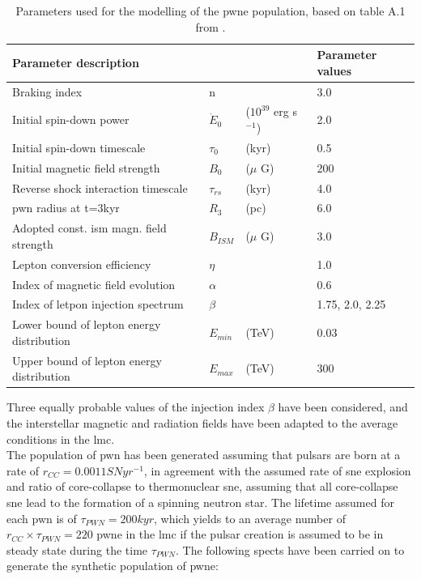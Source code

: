 \documentclass[main.tex]{subfiles}
\begin{document}
\begin{table}
  \centering
  \begin{tabular}{llll}
    \hline
    Parameter description & & & Parameter values \\
    \hline
    Braking index & n &  & 3.0 \\
    Initial spin-down power & $\dot E_{0}$ & ($10^{39}$ erg s$^{-1}$) & 2.0 \\
    Initial spin-down timescale &$\tau_{0}$ & (kyr) & 0.5 \\
    Initial magnetic field strength & $B_{0}$ & ($\mu$ G) & 200\\
    Reverse shock interaction timescale & $\tau_{rs}$ & (kyr) & 4.0 \\
    \gls{pwn} radius at t=3kyr & $R_{3}$ & (pc) & 6.0 \\
    Adopted const. \gls{ism} magn. field strength & $B_{ISM}$ &($\mu$ G) & 3.0 \\
    Lepton conversion efficiency & $\eta$ & & 1.0 \\
    Index of magnetic field evolution & $\alpha$ & & 0.6 \\
    Index of letpon injection spectrum & $\beta$ & & 1.75, 2.0, 2.25\\
    Lower bound of lepton energy distribution & $E_{min}$ & (TeV) & 0.03 \\
    Upper bound of lepton energy distribution & $E_{max}$ & (TeV) & 300\\
    \hline
  \end{tabular}
  \caption{Parameters used for the modelling of the \gls{pwne} population, based on table A.1 from \cite{2018hessPWNe}.}
  \label{tab:baselinemodelpwne}
\end{table}

Three equally probable values of the injection index $\beta$ have been considered, and the interstellar magnetic and radiation fields have been adapted to the average conditions in the \gls{lmc}.\\
The population of \gls{pwn} has been generated assuming that pulsars are born at a rate of $r_{CC} = 0.0011 SN yr^{-1}$, in agreement with the assumed rate of \gls{sne} explosion and ratio of core-collapse to thermonuclear \gls{sne}, assuming that all core-collapse \gls{sne} lead to the formation of a spinning neutron star. The lifetime assumed for each \gls{pwn} is of $\tau_{PWN} = 200 kyr$, which yields to an average number of $r_{CC} \times \tau_{PWN} = 220$ \gls{pwne} in the \gls{lmc} if the pulsar creation is assumed to be in steady state during the time $\tau_{PWN}$. The following spects have been carried on to generate the synthetic population of \gls{pwne}:
\end{document}
